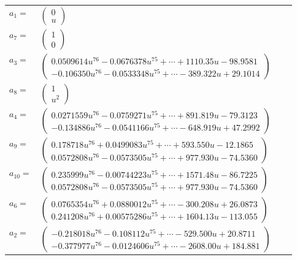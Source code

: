 \documentclass[1p]{elsarticle_modified}
\theoremstyle{definition}
\begin{document}
\begin{tabular}{m{7pt} m{180pt} m{7pt} m{180pt} }
\flushright $a_{1}=$&$\begin{pmatrix}0\\u\end{pmatrix}$ \\
\flushright $a_{7}=$&$\begin{pmatrix}1\\0\end{pmatrix}$ \\
\flushright $a_{3}=$&$\begin{pmatrix}0.0509614 u^{76}-0.0676378 u^{75}+\cdots+1110.35 u-98.9581\\-0.106350 u^{76}-0.0533348 u^{75}+\cdots-389.322 u+29.1014\end{pmatrix}$ \\
\flushright $a_{8}=$&$\begin{pmatrix}1\\u^2\end{pmatrix}$ \\
\flushright $a_{4}=$&$\begin{pmatrix}0.0271559 u^{76}-0.0759271 u^{75}+\cdots+891.819 u-79.3123\\-0.134886 u^{76}-0.0541166 u^{75}+\cdots-648.919 u+47.2992\end{pmatrix}$ \\
\flushright $a_{9}=$&$\begin{pmatrix}0.178718 u^{76}+0.0499083 u^{75}+\cdots+593.550 u-12.1865\\0.0572808 u^{76}-0.0573505 u^{75}+\cdots+977.930 u-74.5360\end{pmatrix}$ \\
\flushright $a_{10}=$&$\begin{pmatrix}0.235999 u^{76}-0.00744223 u^{75}+\cdots+1571.48 u-86.7225\\0.0572808 u^{76}-0.0573505 u^{75}+\cdots+977.930 u-74.5360\end{pmatrix}$ \\
\flushright $a_{6}=$&$\begin{pmatrix}0.0765354 u^{76}+0.0880012 u^{75}+\cdots-300.208 u+26.0873\\0.241208 u^{76}+0.00575286 u^{75}+\cdots+1604.13 u-113.055\end{pmatrix}$ \\
\flushright $a_{2}=$&$\begin{pmatrix}-0.218018 u^{76}-0.108112 u^{75}+\cdots-529.500 u+20.8711\\-0.377977 u^{76}-0.0124606 u^{75}+\cdots-2608.00 u+184.881\end{pmatrix}$ \\

\end{tabular}
\end{document}
